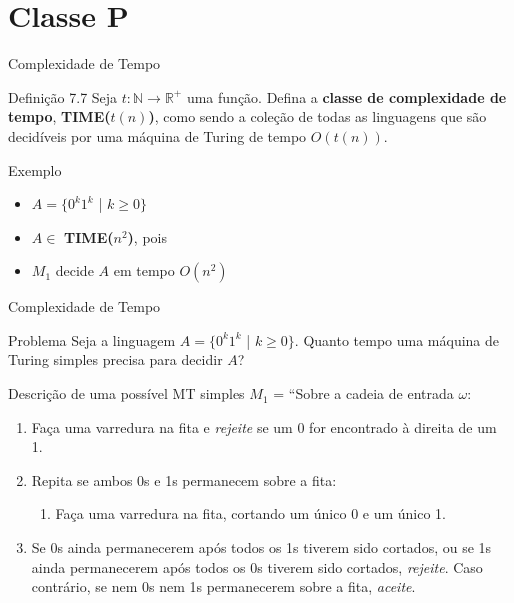 \documentclass[xcolor=dvipsnames,table]{beamer}
\begin{document}
	\section{Classe P}
	\begin{frame}{Complexidade de Tempo}
		\begin{block}{Definição 7.7}
			Seja $t: \mathbb{N} \rightarrow \mathbb{R}^+$ uma função. Defina a {\bf classe de complexidade de tempo}, {\bf TIME($t(n)$)}, como sendo a coleção de todas as linguagens que são decidíveis por uma máquina de Turing de tempo $O(t(n))$.
		\end{block} \pause
		\begin{block}{Exemplo}
			\begin{itemize}
				\item $A = \{ 0^k 1^k$ | $k \geq 0 \}$
				\item $A \in$ {\bf TIME($n^2$)}, pois \pause
				\item $M_1$ decide $A$ em tempo $O(n^2)$
			\end{itemize}
		\end{block}
	\end{frame}
	
	\begin{frame}[shrink]{Complexidade de Tempo}
		\begin{block}{Problema}
			Seja a linguagem $A = \{ 0^k 1^k$ | $k \geq 0 \}$. Quanto tempo uma máquina de Turing simples precisa para decidir $A$?
		\end{block} 
		\begin{block}{Descrição de uma possível MT simples}
			$M_1$ = ``Sobre a cadeia de entrada $\omega$:
			\begin{enumerate}
				\item Faça uma varredura na fita e {\it rejeite} se um 0 for encontrado à direita de um 1.
				\item Repita se ambos 0s e 1s permanecem sobre a fita:
				\begin{enumerate}
					\item Faça uma varredura na fita, cortando um único 0 e um único 1.
				\end{enumerate}
				\item Se 0s ainda permanecerem após todos os 1s tiverem sido cortados, ou se 1s ainda permanecerem após todos os 0s tiverem sido cortados, {\it rejeite}. Caso contrário, se nem 0s nem 1s permanecerem sobre a fita, {\it aceite}.
			\end{enumerate}
		\end{block}
	\end{frame}
	
\end{document}
